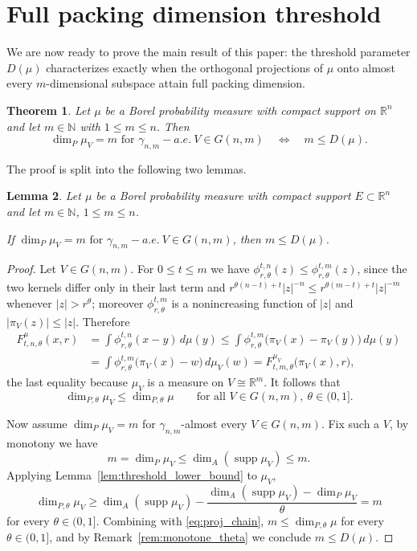\documentclass[12pt]{amsart}
\newtheorem{theorem}{Theorem}[section]
\newtheorem{lemma}[theorem]{Lemma}
\theoremstyle{definition}
\theoremstyle{remark}
\numberwithin{equation}{section}
\begin{document}
\section{Full packing dimension threshold}

We are now ready to prove the main result of this paper: the threshold
parameter $D(\mu)$ characterizes exactly when the orthogonal projections
of $\mu$ onto almost every $m$-dimensional subspace attain full packing
dimension.

\begin{theorem}\label{maintheorem}
    Let $\mu$ be a Borel probability measure with compact support on
    $\mathbb{R}^n$ and let $m\in\mathbb{N}$ with $1\leq m\leq n$. Then
    $$\dim_P \mu_V = m \text{ for }\gamma_{n,m}-a.e.\ V\in G(n,m) \quad\Longleftrightarrow\quad m\leq D(\mu).$$
\end{theorem}

The proof is split into the following two lemmas.



\begin{lemma}\label{mleqdu}
    Let $\mu$ be a Borel probability measure with compact support
    $E\subset\mathbb{R}^n$ and let $m\in\mathbb{N}$, $1\leq m\leq n$.
    
    If
    $\dim_P \mu_V = m \text{ for }\gamma_{n,m}-a.e.\ V\in G(n,m)$, then $m\leq D(\mu)$.
\end{lemma}
\begin{proof}

Let $V\in G(n,m)$. For $0\leq t\leq m$ we have
$\phi_{r,\theta}^{t,n}(z)\leq\phi_{r,\theta}^{t,m}(z)$, since the two
kernels differ only in their last term and
$r^{\theta(n-t)+t}|z|^{-n}\leq r^{\theta(m-t)+t}|z|^{-m}$ whenever
$|z|>r^{\theta}$; moreover $\phi_{r,\theta}^{t,m}$ is a nonincreasing
function of $|z|$ and $|\pi_V(z)|\leq|z|$. Therefore
\begin{align*}
    F_{t,n,\theta}^{\mu}(x,r)&=\int \phi_{r,\theta}^{t,n}(x-y)\, d\mu(y)
    \leq\int \phi_{r,\theta}^{t,m}\bigl(\pi_V(x)-\pi_V(y)\bigr)\, d\mu(y)\\
    &= \int \phi_{r,\theta}^{t,m}\bigl(\pi_V(x)-w\bigr)\, d\mu_V(w)
    =F_{t,m,\theta}^{\mu_V}\bigl(\pi_V(x),r\bigr),
\end{align*}
the last equality because $\mu_V$ is a measure on $V\cong\mathbb{R}^m$.
It follows that
\begin{equation}\label{eq:proj_chain}
\dim_{P,\theta}\mu_V \leq \dim_{P,\theta}\mu
\qquad\text{for all }V\in G(n,m),\ \theta\in(0,1].
\end{equation}


Now assume $\dim_P\mu_V=m$ for $\gamma_{n,m}$-almost
every $V\in G(n,m)$. Fix such a $V$, by monotony we have
$$m=\dim_P\mu_V\leq\dim_A(\operatorname{supp}\mu_V)\leq m.$$
Applying
Lemma~\ref{lem:threshold_lower_bound} to $\mu_V$,
$$\dim_{P,\theta}\mu_V\geq
\dim_A(\operatorname{supp}\mu_V)-\frac{\dim_A(\operatorname{supp}\mu_V)
-\dim_P\mu_V}{\theta}=m$$
for every $\theta\in(0,1].$
Combining with \eqref{eq:proj_chain}, $m\leq\dim_{P,\theta}\mu$ for
every $\theta\in(0,1]$, and by Remark~\ref{rem:monotone_theta} we
conclude $m\leq D(\mu)$.
\end{proof}
\end{document}
